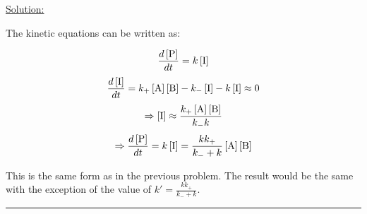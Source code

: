 \noindent
\underline{Solution:}

The kinetic equations can be written as:

$$\frac{d\left[\textnormal{P}\right]}{dt} = k\left[\textnormal{I}\right]$$
$$\frac{d\left[\textnormal{I}\right]}{dt} = k_+\left[\textnormal{A}\right]\left[\textnormal{B}\right] - k_-\left[\textnormal{I}\right] - k\left[\textnormal{I}\right] \approx 0$$
$$\Rightarrow \left[\textnormal{I}\right] \approx \frac{k_+\left[\textnormal{A}\right]\left[\textnormal{B}\right]}{k_-k}$$
$$\Rightarrow \frac{d\left[\textnormal{P}\right]}{dt} = k\left[\textnormal{I}\right] = \frac{kk_+}{k_- + k}\left[\textnormal{A}\right]\left[\textnormal{B}\right]$$

\noindent
This is the same form as in the previous problem. The result would be the same with the exception of the value of $k' = \frac{kk_+}{k_- + k}$.

\hrule\vspace{0.5cm}
